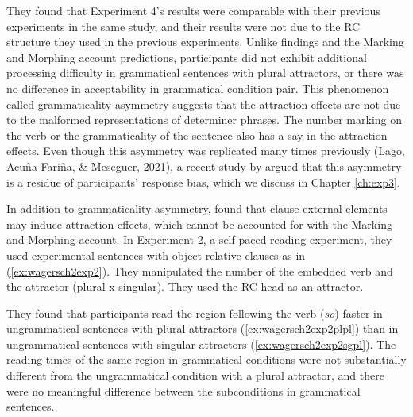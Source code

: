 They found that Experiment 4's results were comparable with their previous experiments in the same study, and their results were not due to the RC structure they used in the previous experiments. Unlike \cites{PearlmutterGarnseyBock:1999} findings and the Marking and Morphing account predictions, participants did not exhibit additional processing difficulty in grammatical sentences with plural attractors, or there was no difference in acceptability in grammatical condition pair. This phenomenon called grammaticality asymmetry suggests that the attraction effects are not due to the malformed representations of determiner phrases. The number marking on the verb or the grammaticality of the sentence also has a say in the attraction effects. Even though this asymmetry was replicated many times previously (Lago, Acu{\~n}a-Fari{\~n}a, \& Meseguer, 2021), a recent study by  argued that this asymmetry is a residue of participants' response bias, which we discuss in Chapter \ref{ch:exp3}.

In addition to grammaticality asymmetry,  found that clause-external elements may induce attraction effects, which cannot be accounted for with the Marking and Morphing account. In Experiment 2, a self-paced reading experiment, they used experimental sentences with object relative clauses as in (\ref{ex:wagersch2exp2}). They manipulated the number of the embedded verb and the attractor (plural x singular). They used the RC head as an attractor. 

\ea \label{ex:wagersch2exp2}
  \z
\z

They found that participants read the region following the verb (\emph{so}) faster in ungrammatical sentences with plural attractors (\ref{ex:wagersch2exp2plpl}) than in ungrammatical sentences with singular attractors (\ref{ex:wagersch2exp2sgpl}). The reading times of the same region in grammatical conditions were not substantially different from the ungrammatical condition with a plural attractor, and there were no meaningful difference between the subconditions in grammatical sentences.

